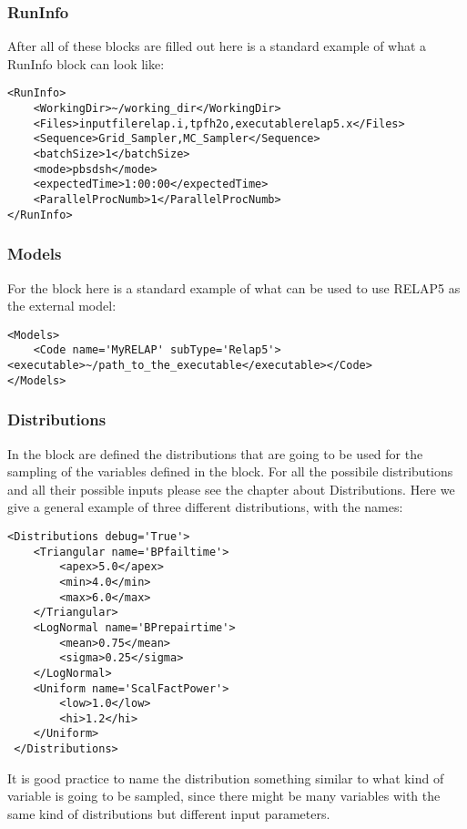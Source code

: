 \subsubsection{RunInfo}
After all of these blocks are filled out here is a standard example of what a
RunInfo block can look like:
\begin{lstlisting}[style=XML]
<RunInfo>
    <WorkingDir>~/working_dir</WorkingDir>
    <Files>inputfilerelap.i,tpfh2o,executablerelap5.x</Files>
    <Sequence>Grid_Sampler,MC_Sampler</Sequence>
    <batchSize>1</batchSize>
	<mode>pbsdsh</mode>
    <expectedTime>1:00:00</expectedTime>
    <ParallelProcNumb>1</ParallelProcNumb>
</RunInfo>
\end{lstlisting}
\subsubsection{Models}
For the  block here is a standard example of what can be used to use
RELAP5 as the external model:
\begin{lstlisting}[style=XML]
<Models>
    <Code name='MyRELAP' subType='Relap5'><executable>~/path_to_the_executable</executable></Code>
</Models>
\end{lstlisting}
\subsubsection{Distributions}
In the  block are defined the distributions that are going to be
used for the sampling of the variables defined in the  block.
%
For all the possibile distributions and all their possible inputs please see the
chapter about Distributions.
%
Here we give a general example of three different distributions, with the names:
\begin{lstlisting}[style=XML]
<Distributions debug='True'>
    <Triangular name='BPfailtime'>
        <apex>5.0</apex>
        <min>4.0</min>
		<max>6.0</max>
    </Triangular>
    <LogNormal name='BPrepairtime'>
        <mean>0.75</mean>
        <sigma>0.25</sigma>
    </LogNormal>
	<Uniform name='ScalFactPower'>
        <low>1.0</low>
        <hi>1.2</hi>
    </Uniform>
 </Distributions>
\end{lstlisting}
It is good practice to name the distribution something similar to what kind of
variable is going to be sampled, since there might be many variables with the
same kind of distributions but different input parameters.
%
